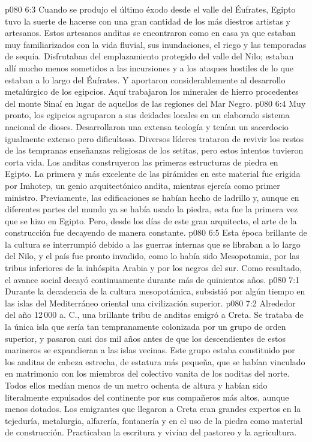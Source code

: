 \vs p080 6:3 \pc Cuando se produjo el último éxodo desde el valle del Éufrates, Egipto tuvo la suerte de hacerse con una gran cantidad de los más diestros artistas y artesanos. Estos artesanos anditas se encontraron como en casa ya que estaban muy familiarizados con la vida fluvial, sus inundaciones, el riego y las temporadas de sequía. Disfrutaban del emplazamiento protegido del valle del Nilo; estaban allí mucho menos sometidos a las incursiones y a los ataques hostiles de lo que estaban a lo largo del Éufrates. Y aportaron considerablemente al desarrollo metalúrgico de los egipcios. Aquí trabajaron los minerales de hierro procedentes del monte Sinaí en lugar de aquellos de las regiones del Mar Negro.
\vs p080 6:4 \pc Muy pronto, los egipcios agruparon a sus deidades locales en un elaborado sistema nacional de dioses. Desarrollaron una extensa teología y tenían un sacerdocio igualmente extenso pero dificultoso. Diversos líderes trataron de revivir los restos de las tempranas enseñanzas religiosas de los setitas, pero estos intentos tuvieron corta vida. Los anditas construyeron las primeras estructuras de piedra en Egipto. La primera y más excelente de las pirámides en este material fue erigida por Imhotep, un genio arquitectónico andita, mientras ejercía como primer ministro. Previamente, las edificaciones se habían hecho de ladrillo y, aunque en diferentes partes del mundo ya se había usado la piedra, esta fue la primera vez que se hizo en Egipto. Pero, desde los días de este gran arquitecto, el arte de la construcción fue decayendo de manera constante.
\vs p080 6:5 Esta época brillante de la cultura se interrumpió debido a las guerras internas que se libraban a lo largo del Nilo, y el país fue pronto invadido, como lo había sido Mesopotamia, por las tribus inferiores de la inhóspita Arabia y por los negros del sur. Como resultado, el avance social decayó continuamente durante más de quinientos años.
\vs p080 7:1 Durante la decadencia de la cultura mesopotámica, subsistió por algún tiempo en las islas del Mediterráneo oriental una civilización superior.
\vs p080 7:2 Alrededor del año 12\,000 a. C., una brillante tribu de anditas emigró a Creta. Se trataba de la única isla que sería tan tempranamente colonizada por un grupo de orden superior, y pasaron casi dos mil años antes de que los descendientes de estos marineros se expandieran a las islas vecinas. Este grupo estaba constituido por los anditas de cabeza estrecha, de estatura más pequeña, que se habían vinculado en matrimonio con los miembros del colectivo vanita de los noditas del norte. Todos ellos medían menos de un metro ochenta de altura y habían sido literalmente expulsados del continente por sus compañeros más altos, aunque menos dotados. Los emigrantes que llegaron a Creta eran grandes expertos en la tejeduría, metalurgia, alfarería, fontanería y en el uso de la piedra como material de construcción. Practicaban la escritura y vivían del pastoreo y la agricultura.
